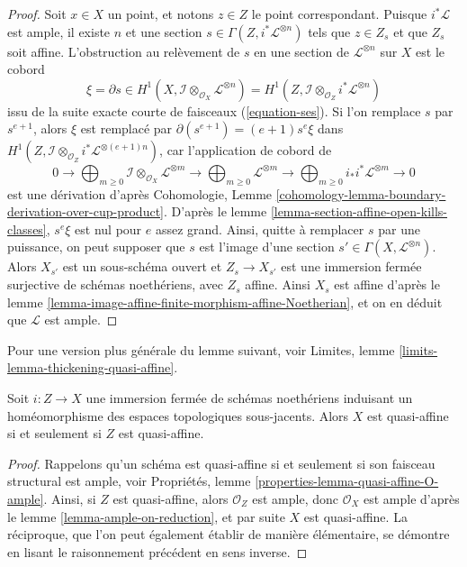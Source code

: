 \begin{proof}
\medskip\noindent
Soit $x \in X$ un point, et notons $z \in Z$ le point correspondant.
Puisque $i^*\mathcal{L}$ est ample, il existe $n$ et une section
$s \in \Gamma(Z, i^*\mathcal{L}^{\otimes n})$ tels que $z \in Z_s$
et que $Z_s$ soit affine. L'obstruction au relèvement de $s$ en une section
de $\mathcal{L}^{\otimes n}$ sur $X$ est le cobord
$$
\xi = \partial s \in
H^1(X, \mathcal{I} \otimes_{\mathcal{O}_X} \mathcal{L}^{\otimes n}) =
H^1(Z, \mathcal{I} \otimes_{\mathcal{O}_Z} i^*\mathcal{L}^{\otimes n})
$$
issu de la suite exacte courte de faisceaux (\ref{equation-ses}).
Si l'on remplace $s$ par $s^{e + 1}$, alors $\xi$ est remplacé par
$\partial(s^{e + 1}) = (e + 1) s^e \xi$ dans
$H^1(Z, \mathcal{I} \otimes_{\mathcal{O}_Z} i^*\mathcal{L}^{\otimes (e + 1)n})$,
car l'application de cobord de
$$
0 \to
\bigoplus\nolimits_{m \geq 0}
\mathcal{I} \otimes_{\mathcal{O}_X} \mathcal{L}^{\otimes m} \to
\bigoplus\nolimits_{m \geq 0}
\mathcal{L}^{\otimes m} \to
\bigoplus\nolimits_{m \geq 0}
i_*i^*\mathcal{L}^{\otimes m} \to 0
$$
est une dérivation d'après Cohomologie, Lemme
\ref{cohomology-lemma-boundary-derivation-over-cup-product}. D'après le
lemme \ref{lemma-section-affine-open-kills-classes},
$s^e \xi$ est nul pour $e$ assez grand.
Ainsi, quitte à remplacer $s$ par une puissance, on peut supposer que $s$ est l'image
d'une section $s' \in \Gamma(X, \mathcal{L}^{\otimes n})$.
Alors $X_{s'}$ est un sous-schéma ouvert et $Z_s \to X_{s'}$ est une immersion
fermée surjective de schémas noethériens, avec $Z_s$ affine. Ainsi
$X_s$ est affine d'après le
lemme \ref{lemma-image-affine-finite-morphism-affine-Noetherian}, et
on en déduit que $\mathcal{L}$ est ample.
\end{proof}

\noindent
Pour une version plus générale du lemme suivant, voir
Limites, lemme \ref{limits-lemma-thickening-quasi-affine}.

\begin{lemma}
\label{lemma-thickening-quasi-affine}
Soit $i : Z \to X$ une immersion fermée de schémas noethériens induisant
un homéomorphisme des espaces topologiques sous-jacents.
Alors $X$ est quasi-affine si et seulement si $Z$ est quasi-affine.
\end{lemma}

\begin{proof}
Rappelons qu'un schéma est quasi-affine si
et seulement si son faisceau structural est ample, voir
Propriétés, lemme \ref{properties-lemma-quasi-affine-O-ample}.
Ainsi, si $Z$ est quasi-affine, alors $\mathcal{O}_Z$ est ample,
donc $\mathcal{O}_X$ est ample d'après le
lemme \ref{lemma-ample-on-reduction}, et par suite
$X$ est quasi-affine. La réciproque, que l'on peut
également établir de manière élémentaire, se démontre en lisant le
raisonnement précédent en sens inverse.
\end{proof}

